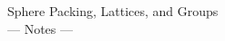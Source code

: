 \documentclass{article}
\renewcommand{\=}{\equiv}
\begin{document}
\begin{center}
  {\huge\sc Sphere Packing, Lattices, and Groups}\\[2em]
  {\Large --- Notes ---}
\end{center}

\vspace{4em}
\end{document}
